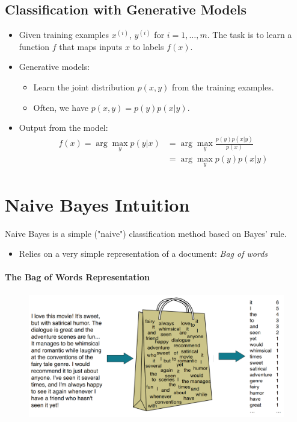 \documentclass{book}
\begin{document}
\subsection{Classification with Generative Models}
  \begin{itemize}
    \item Given training examples $x^{(i)}$, $y^{(i)}$ for $i = 1, \ldots, m$. The task is to learn a function $f$ that maps inputs $x$ to labels $f(x)$.
    \item Generative models:
    \begin{itemize}
      \item Learn the joint distribution $p(x, y)$ from the training examples.
      \item Often, we have $p(x, y) = p(y)p(x|y)$.
    \end{itemize}
    \item Output from the model:
\[
\begin{aligned}
f(x) = \arg\max_y p(y|x) &= \arg\max_y \frac{p(y)p(x|y)}{p(x)} \\
&= \arg\max_y p(y)p(x|y)
\end{aligned}
\]
  \end{itemize}



\section{Naive Bayes Intuition}
    Naive Bayes is a simple ("naive") classification method based on Bayes' rule.
    \begin{itemize}
        \item Relies on a very simple representation of a document: \textit{Bag of words}
    \end{itemize}


\paragraph{The Bag of Words Representation}

\begin{figure}[h]
\includegraphics[scale = 0.22]{pics/bow.png}
\end{figure}
\end{document}

